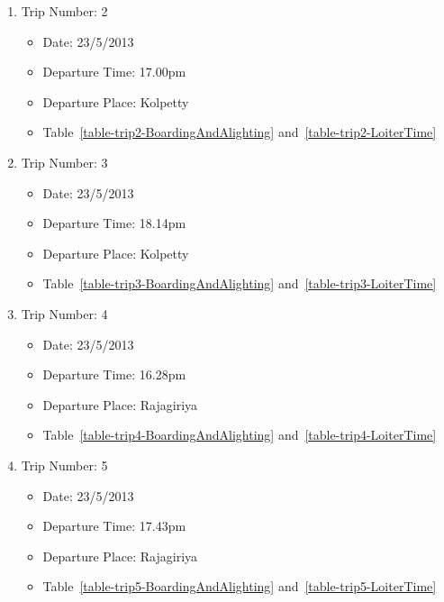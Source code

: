 \documentclass[12pt, oneside]{report}
\begin{document}
\begin{enumerate}

\item Trip Number: 2
\begin{itemize}
\item Date: 23/5/2013
\item Departure Time: 17.00pm
\item Departure Place: Kolpetty
\item Table~\ref{table-trip2-BoardingAndAlighting} and~\ref{table-trip2-LoiterTime}
\end{itemize}

\item Trip Number: 3
\begin{itemize}
\item Date: 23/5/2013
\item Departure Time: 18.14pm
\item Departure Place: Kolpetty
\item Table~\ref{table-trip3-BoardingAndAlighting} and~\ref{table-trip3-LoiterTime}
\end{itemize}

\item Trip Number: 4
\begin{itemize}
\item Date: 23/5/2013
\item Departure Time: 16.28pm
\item Departure Place: Rajagiriya
\item Table~\ref{table-trip4-BoardingAndAlighting} and~\ref{table-trip4-LoiterTime}
\end{itemize}

\item Trip Number: 5
\begin{itemize}
\item Date: 23/5/2013
\item Departure Time: 17.43pm
\item Departure Place: Rajagiriya
\item Table~\ref{table-trip5-BoardingAndAlighting} and~\ref{table-trip5-LoiterTime}
\end{itemize}

\end{enumerate}

\end{document}
